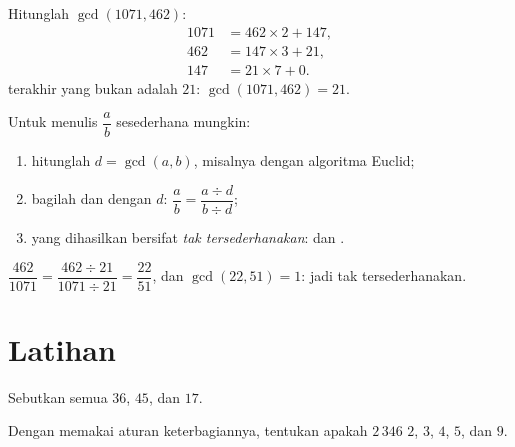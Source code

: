 \begin{example}\label{ex:g9:arith:euclidalgo}
Hitunglah $\gcd(1071, 462)$:
\begin{align*}
1071 &= 462 \times 2 + 147, \\
462 &= 147 \times 3 + 21, \\
147 &= 21 \times 7 + 0 .
\end{align*}
 terakhir yang bukan  adalah $21$: $\gcd(1071, 462) = 21$.
\end{example}

\begin{method}\label{met:g9:arith:simplify}
Untuk menulis $\dfrac ab$ sesederhana mungkin:
\begin{enumerate}
  \item hitunglah $d = \gcd(a, b)$, misalnya dengan algoritma Euclid;
  \item bagilah  dan  dengan $d$:
        $\dfrac ab = \dfrac{a \div d}{b \div d}$;
  \item {} yang dihasilkan bersifat \emph{tak tersederhanakan}:
         dan  .
\end{enumerate}
\end{method}

\begin{example}
$\dfrac{462}{1071} = \dfrac{462 \div 21}{1071 \div 21} = \dfrac{22}{51}$,
dan $\gcd(22, 51) = 1$: jadi tak tersederhanakan.
\end{example}

\section{Latihan}

\begin{exercise}[$\star$]\label{exo:g9:arith:1}
Sebutkan semua  $36$,  $45$, dan  $17$.
\end{exercise}

\begin{exercise}[$\star$]\label{exo:g9:arith:2}
Dengan memakai aturan keterbagiannya, tentukan apakah $2\,346$  $2$, $3$, $4$, $5$, dan $9$.
\end{exercise}


